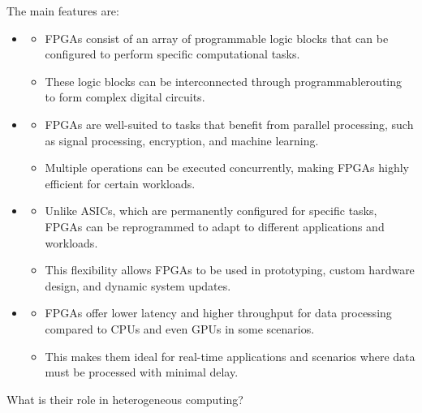 \highspace
The main features are:
\begin{itemize}
    \item {}
    \begin{itemize}
        \item FPGAs consist of an array of programmable logic blocks that can be configured to perform specific computational tasks.
        \item These logic blocks can be interconnected through programmable\break routing to form complex digital circuits.
    \end{itemize}

    \item {}
    \begin{itemize}
        \item FPGAs are well-suited to tasks that benefit from parallel processing, such as signal processing, encryption, and machine learning.
        \item Multiple operations can be executed concurrently, making FPGAs highly efficient for certain workloads.
    \end{itemize}

    \item {}
    \begin{itemize}
        \item Unlike ASICs, which are permanently configured for specific tasks, FPGAs can be reprogrammed to adapt to different applications and workloads.
        \item This flexibility allows FPGAs to be used in prototyping, custom hardware design, and dynamic system updates.
    \end{itemize}

    \item {}
    \begin{itemize}
        \item FPGAs offer lower latency and higher throughput for data processing compared to CPUs and even GPUs in some scenarios.
        \item This makes them ideal for real-time applications and scenarios where data must be processed with minimal delay.
    \end{itemize}
\end{itemize}
What is their role in heterogeneous computing?
